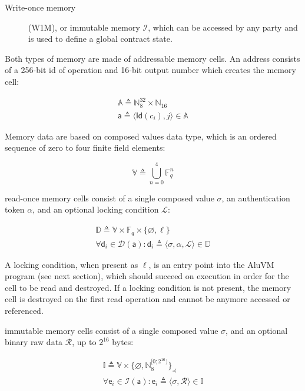 \documentclass[a4paper]{article}
\begin{document}
\begin{multicols}{2}
\begin{description}
    \item[Write-once memory] (W1M), or \gls{immutable memory} $\mathcal{I}$, which can be accessed by any
    party and is used to define a global contract state.
\end{description}

Both types of memory are made of addressable memory cells.
An address consists of a 256-bit id of operation and 16-bit output number
which creates the memory cell:

\begin{gather}
\mathbb{A} \triangleq \mathbb{N}^{32}_8 \times \mathbb{N}_{16} \\
\mathsf{a} \triangleq \langle \mathsf{Id}(c_i), j \rangle \in \mathbb{A}
\end{gather}

Memory data are based on \glspl{composed value} data type,
which is an ordered sequence of zero to four finite field elements:

\begin{equation}
\mathbb{V} \triangleq \bigcup_{n=0}^{4} \mathbb{F}_q^n
\end{equation}

\Gls{read-once memory} cells consist of a single \gls{composed value} $\sigma$,
an \gls{authentication token} $\alpha$, and an optional \gls{locking condition} $\mathcal{L}$:

\begin{gather}
\mathbb{D} \triangleq \mathbb{V} \times \mathbb{F}_q \times \{ \varnothing, \ell \} \\
\forall \mathsf{d}_i \in \mathcal{D}(\mathsf{a}) : \mathsf{d}_i \triangleq \langle \sigma, \alpha, \mathcal{L} \rangle \in \mathbb{D}
\end{gather}

A locking condition, when present as $\ell$, is an entry point into the AluVM program (see next section),
which should succeed on execution in order for the cell to be read and destroyed.
If a locking condition is not present, the memory cell is destroyed on the first read operation
and cannot be anymore accessed or referenced.

\Gls{immutable memory} cells consist of a single \gls{composed value} $\sigma$,
and an optional binary raw data $\mathcal{R}$, up to $2^{16}$ bytes:

\begin{gather}
\mathbb{I} \triangleq \mathbb{V} \times \{ \varnothing, \mathbb{N}_8^{[0; 2^{16})} \}_\preceq \\
\forall \mathsf{e}_i \in \mathcal{I}(\mathsf{a}) : \mathsf{e}_i \triangleq \langle \sigma, \mathcal{R} \rangle \in \mathbb{I}
\end{gather}


\end{multicols}
\end{document}
